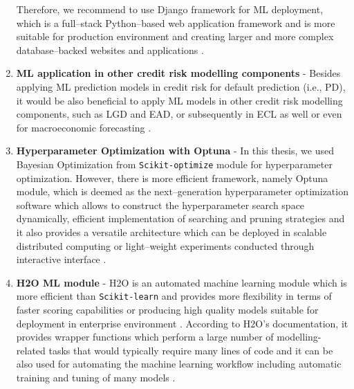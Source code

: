 \begin{enumerate}
    Therefore, we recommend to use Django framework for ML deployment, which is a full--stack Python--based web application framework and is more suitable for production environment and creating larger and more complex database--backed websites and applications \citep{khatri2023}.
    \item \textbf{ML application in other credit risk modelling components} - Besides applying ML prediction models in credit risk for default prediction (i.e., PD), it would be also beneficial to apply ML models in other credit risk modelling components, such as LGD and EAD, or subsequently in ECL as well \citep{munkhdalai2019empirical, grzybowska2020application} or even for macroeconomic forecasting \citep{hall2018machine}.
    \item \textbf{Hyperparameter Optimization with Optuna} - In this thesis, we used Bayesian Optimization from \lstinline{Scikit-optimize} module for hyperparameter optimization. However, there is more efficient framework, namely Optuna module, which is deemed as the next--generation hyperparameter optimization software which allows to construct the hyperparameter search space dynamically, efficient implementation of searching and pruning strategies and it also provides
    a versatile architecture which can be deployed in scalable distributed computing or light--weight experiments conducted through interactive interface \citep{akiba2019optuna}.
    \item \textbf{H2O ML module} - H2O is an automated machine learning module which is more efficient than \lstinline{Scikit-learn} and provides more flexibility in terms of faster scoring capabilities or producing high quality models suitable for deployment in enterprise environment  \citep{ledell2020h2o}. 
    According to H2O's documentation, it provides wrapper functions which perform a large number of modelling-related tasks that would typically require many lines of code and it can be also used for automating the machine learning workflow including automatic training and tuning of many models \citep{H2Oai2023}.
\end{enumerate}